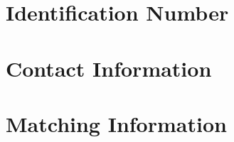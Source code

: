\documentclass[
  12pt,
  english,
  print_questionnaire_id,
  oneside,
  checkmode=fill,
  style=qr,
  nostamp]{sdapsclassic}
\title{}
\newlength{\mytextboxheight}
\begin{document}
  \begin{questionnaire}[noinfo]

    \section{Identification Number}
      \begin{choicegroup}{}

      \end{choicegroup}

    \section{Contact Information}

    \newpage
    \section{Matching Information}
      \begin{multicols}{3}
        \begin{choicegroup}{}


\end{choicegroup}
\end{multicols}
\end{questionnaire}
\end{document}
